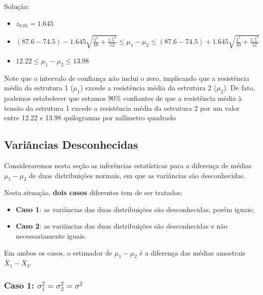 \documentclass[
]{book}
\providecommand{\tightlist}{%
  \setlength{\itemsep}{0pt}\setlength{\parskip}{0pt}}
\begin{document}
Solução:

\begin{itemize}
\tightlist
\item
  \(z_{0.05}=1.645\)
\item
  \((87.6-74.5) -1.645\sqrt{\frac{1^2}{10}+\frac{1.5^2}{12}}\leq \mu_1-\mu_2 \leq (87.6-74.5)+1.645\sqrt{\frac{1^2}{10}+\frac{1.5^2}{12}}\)
\item
  \(12.22 \leq \mu_1-\mu_2 \leq 13.98\)
\end{itemize}

Note que o intervalo de confiança não inclui o zero, implicando que a resistência média da estrutura 1 (\(\mu_1\)) excede a resistência média da estrutura 2 (\(\mu_2\)). De fato, podemos estabelecer que estamos 90\% confiantes de que a resistência média à tensão da estrutura 1 excede a resistência média da estrutura 2 por um valor entre 12.22 e 13.98 quilogramas por milímetro quadrado

\hypertarget{variuxe2ncias-desconhecidas}{%
\subsection{Variâncias Desconhecidas}\label{variuxe2ncias-desconhecidas}}

Consideraremos nesta seção as inferências estatísticas para a diferença de médias \(\mu_1-\mu_2\) de duas distribuições normais, em que as variâncias são desconhecidas.

Nesta situação, \textbf{dois casos} diferentes tem de ser tratados:

\begin{itemize}
\tightlist
\item
  \textbf{Caso 1}: as variâncias das duas distribuições são desconhecidas, porém iguais;
\item
  \textbf{Caso 2}: as variâncias das duas distribuições são desconhecidas e não necessariamente iguais.
\end{itemize}

Em ambos os casos, o estimador de \(\mu_1-\mu_2\) é a diferença das médias amostrais \(\bar X_1-\bar X_2\).

\hypertarget{caso-1-sigma2_1sigma2_2sigma2}{%
\subsubsection{\texorpdfstring{Caso 1: \(\sigma^2_1=\sigma^2_2=\sigma^2\)}{Caso 1: \textbackslash sigma\^{}2\_1=\textbackslash sigma\^{}2\_2=\textbackslash sigma\^{}2}}\label{caso-1-sigma2_1sigma2_2sigma2}}
\end{document}
